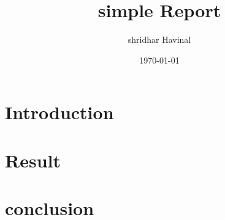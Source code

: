 \documentclass{report}
\title{simple Report}
\author{shridhar Havinal}
\date{\today}
\begin{document}
	\maketitle
	\tableofcontents
	
	\chapter{Introduction}
	\lipsum[1]
	
	\chapter{Result}
	\lipsum[2]
	
	\chapter{conclusion}
	\lipsum[3]
\end{document}
